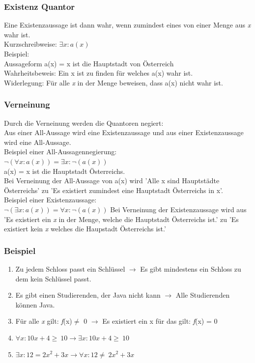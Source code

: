 \documentclass{article}
\begin{document}
	\subsubsection{Existenz Quantor}
	Eine Existenzaussage ist dann wahr, wenn zumindest eines von einer Menge aus \textit{x} wahr ist. \\
	Kurzschreibweise:
	$\exists x:a(x)$ \\
	Beispiel:\\
	Aussageform a(x) = x ist die Hauptstadt von Österreich \\
	Wahrheitsbeweis: Ein x ist zu finden für welches a(x) wahr ist. \\
	Widerlegung: Für alle \textit{x} in der Menge beweisen, dass a(x) nicht wahr ist.
	\subsubsection{Verneinung}
	Durch die Verneinung werden die Quantoren negiert: \\
	Aus einer All-Aussage wird eine Existenzaussage und aus einer Existenzaussage wird eine All-Aussage. \\

	Beispiel einer All-Aussagennegierung: \\
	$\neg(\forall x:a(x)) = \exists x:\neg(a(x))$ \\
	a(x) = x ist die Hauptstadt Österreichs. \\
	Bei Verneinung der All-Aussage von a(x) wird 'Alle x sind Hauptstädte Österreichs' zu 'Es existiert zumindest eine Hauptstadt Österreichs in x'. \\
	Beispiel einer Existenzaussage: \\
	$\neg (\exists x:a(x)) = \forall x:\neg (a(x))$
	Bei Verneinung der Existenzaussage wird aus 'Es existiert ein \textit{x} in der Menge, welche die Hauptstadt Österreichs ist.' zu 'Es existiert kein \textit{x} welches die Haupstadt Österreichs ist.'
	\subsubsection{Beispiel}
	\begin{enumerate}
		\item{Zu jedem Schloss passt ein Schlüssel $\to$ Es gibt mindestens ein Schloss zu dem kein Schlüssel passt.}
		\item{Es gibt einen Studierenden, der Java nicht kann $\to$ Alle Studierenden können Java.}
		\item{Für alle \textit{x} gilt: \textit{f}(x)$\neq$ 0 $\to$ Es existiert ein x für das gilt: \textit{f}(x) = 0}
		\item{$\forall \textit{x}:10x+4\geq\ 10 \to \exists \textit{x}:10x + 4 \geq\ 10$}
		\item{$\exists \textit{x}: 12 = 2x^2+3x \to \forall \textit{x}:12 \neq\ 2x^2+3x$}
	\end{enumerate}
\end{document}
